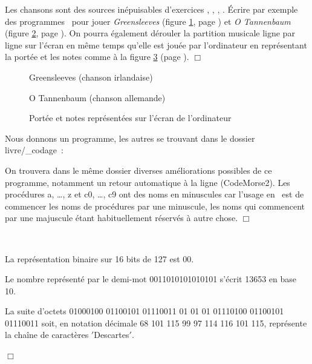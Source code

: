 \begin{exercice}{Les chansons sont des sources inépuisables d'exercices
 \cite{boutet}, \cite{sabatier1}, \cite{sabatier2}, \cite{sabatier3}. 
 Écrire par exemple des programmes 
\python\  pour jouer {\em Green\-sleeves\/} (figure \ref{fig:Greensleeves}, page \pageref{fig:Greensleeves})
et {\em O Tannenbaum\/} (figure \ref{fig:Tannenbaum}, page \pageref{fig:Tannenbaum}).
On pourra également dérouler la partition musicale ligne par ligne sur l'écran 
en même temps qu'elle est jouée par l'ordinateur en re\-pré\-sen\-tant la portée
et les notes comme  à la figure \ref{fig:RepNotes} (page \pageref{fig:RepNotes}).
\noindent $\Box$}\end{exercice}
\begin{figure}[htbp]
 
 \caption{Greensleeves (chanson irlandaise)}\label{fig:Greensleeves}
\end{figure}
\begin{figure}[htbp]
 
 \caption{O Tannenbaum  (chanson allemande)}\label{fig:Tannenbaum}
\end{figure}
\begin{figure}[htbp]
 \caption{Portée et notes représentées sur l'écran de l'ordinateur}\label{fig:RepNotes}
\end{figure}
\begin{corrige}{
Nous donnons un programme, les autres se trouvant dans le dossier {\idt livre/\_codage}~:


On trouvera dans le même dossier diverses améliorations possibles de ce programme, notamment
un retour automatique à la ligne ({\idt CodeMorse2}).
Les procédures {\idt a}, \ldots, {\idt z} et {\idt c0}, \ldots, {\idt c9} ont des noms 
en minuscules car l'usage en \python\ est de commencer les noms de procédures par une minuscule,
les noms qui commencent par une majuscule étant habituellement réservés à autre chose.
\noindent $\Box$}\end{corrige}
\begin{corriges}{\ \\
\vspace{-\baselineskip}

\tiret La représentation binaire sur 16 bits de 127 est 
00.

\tiret Le nombre représenté par le demi-mot 0011010101010101 s'écrit
13653 en base 10.

\tiret La suite d'octets 01000100 01100101 01110011 01 01
01 01110100 01100101 01110011
soit, en notation décimale 68 101 115 99 97 114 116 101 115,
représente la chaîne de caractères
{\cha $\scriptstyle '$Descartes\idt $\scriptstyle '$}.

\noindent $\Box$}\end{corriges}
